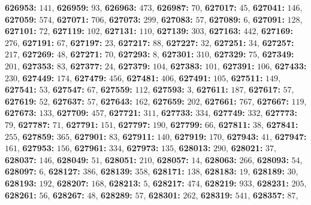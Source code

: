 \textsf{\bfseries 626953:} $141$, \textsf{\bfseries 626959:} $93$, \textsf{\bfseries 626963:} $473$, \textsf{\bfseries 626987:} $70$, \textsf{\bfseries 627017:} $45$, \textsf{\bfseries 627041:} $146$, \textsf{\bfseries 627059:} $574$, \textsf{\bfseries 627071:} $706$, \textsf{\bfseries 627073:} $299$, \textsf{\bfseries 627083:} $57$, \textsf{\bfseries 627089:} $6$, \textsf{\bfseries 627091:} $128$, \textsf{\bfseries 627101:} $72$, \textsf{\bfseries 627119:} $102$, \textsf{\bfseries 627131:} $110$, \textsf{\bfseries 627139:} $303$, \textsf{\bfseries 627163:} $442$, \textsf{\bfseries 627169:} $276$, \textsf{\bfseries 627191:} $67$, \textsf{\bfseries 627197:} $23$, \textsf{\bfseries 627217:} $88$, \textsf{\bfseries 627227:} $32$, \textsf{\bfseries 627251:} $34$, \textsf{\bfseries 627257:} $217$, \textsf{\bfseries 627269:} $48$, \textsf{\bfseries 627271:} $70$, \textsf{\bfseries 627293:} $8$, \textsf{\bfseries 627301:} $310$, \textsf{\bfseries 627329:} $75$, \textsf{\bfseries 627349:} $201$, \textsf{\bfseries 627353:} $83$, \textsf{\bfseries 627377:} $24$, \textsf{\bfseries 627379:} $104$, \textsf{\bfseries 627383:} $101$, \textsf{\bfseries 627391:} $106$, \textsf{\bfseries 627433:} $230$, \textsf{\bfseries 627449:} $174$, \textsf{\bfseries 627479:} $456$, \textsf{\bfseries 627481:} $406$, \textsf{\bfseries 627491:} $105$, \textsf{\bfseries 627511:} $149$, \textsf{\bfseries 627541:} $53$, \textsf{\bfseries 627547:} $67$, \textsf{\bfseries 627559:} $112$, \textsf{\bfseries 627593:} $3$, \textsf{\bfseries 627611:} $187$, \textsf{\bfseries 627617:} $57$, \textsf{\bfseries 627619:} $52$, \textsf{\bfseries 627637:} $57$, \textsf{\bfseries 627643:} $162$, \textsf{\bfseries 627659:} $202$, \textsf{\bfseries 627661:} $767$, \textsf{\bfseries 627667:} $119$, \textsf{\bfseries 627673:} $133$, \textsf{\bfseries 627709:} $457$, \textsf{\bfseries 627721:} $311$, \textsf{\bfseries 627733:} $334$, \textsf{\bfseries 627749:} $332$, \textsf{\bfseries 627773:} $79$, \textsf{\bfseries 627787:} $71$, \textsf{\bfseries 627791:} $151$, \textsf{\bfseries 627797:} $190$, \textsf{\bfseries 627799:} $66$, \textsf{\bfseries 627811:} $38$, \textsf{\bfseries 627841:} $255$, \textsf{\bfseries 627859:} $365$, \textsf{\bfseries 627901:} $83$, \textsf{\bfseries 627911:} $140$, \textsf{\bfseries 627919:} $170$, \textsf{\bfseries 627943:} $41$, \textsf{\bfseries 627947:} $161$, \textsf{\bfseries 627953:} $156$, \textsf{\bfseries 627961:} $334$, \textsf{\bfseries 627973:} $135$, \textsf{\bfseries 628013:} $290$, \textsf{\bfseries 628021:} $37$, \textsf{\bfseries 628037:} $146$, \textsf{\bfseries 628049:} $51$, \textsf{\bfseries 628051:} $210$, \textsf{\bfseries 628057:} $14$, \textsf{\bfseries 628063:} $266$, \textsf{\bfseries 628093:} $54$, \textsf{\bfseries 628097:} $6$, \textsf{\bfseries 628127:} $386$, \textsf{\bfseries 628139:} $358$, \textsf{\bfseries 628171:} $138$, \textsf{\bfseries 628183:} $19$, \textsf{\bfseries 628189:} $30$, \textsf{\bfseries 628193:} $192$, \textsf{\bfseries 628207:} $168$, \textsf{\bfseries 628213:} $5$, \textsf{\bfseries 628217:} $474$, \textsf{\bfseries 628219:} $933$, \textsf{\bfseries 628231:} $205$, \textsf{\bfseries 628261:} $56$, \textsf{\bfseries 628267:} $48$, \textsf{\bfseries 628289:} $57$, \textsf{\bfseries 628301:} $262$, \textsf{\bfseries 628319:} $541$, \textsf{\bfseries 628357:} $87$, 

